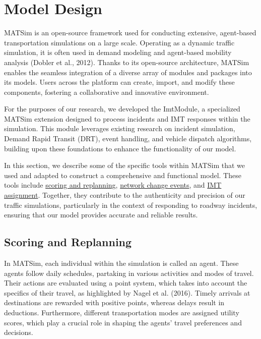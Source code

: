 \documentclass[fancy, oneside, mastersfancy, ms]{byuthesis}
\begin{document}
\hypertarget{sec-MATSim_mod}{%
\section{Model Design}\label{sec-MATSim_mod}}

MATSim is an open-source framework used for conducting extensive,
agent-based transportation simulations on a large scale. Operating as a
dynamic traffic simulation, it is often used in demand modeling and
agent-based mobility analysis (Dobler et al., 2012). Thanks to its
open-source architecture, MATSim enables the seamless integration of a
diverse array of modules and packages into its models. Users across the
platform can create, import, and modify these components, fostering a
collaborative and innovative environment.

For the purposes of our research, we developed the ImtModule, a
specialized MATSim extension designed to process incidents and IMT
responses within the simulation. This module leverages existing research
on incident simulation, Demand Rapid Transit (DRT), event handling, and
vehicle dispatch algorithms, building upon these foundations to enhance
the functionality of our model.

In this section, we describe some of the specific tools within MATSim
that we used and adapted to construct a comprehensive and functional
model. These tools include \protect\hyperlink{sec-MATSim_score}{scoring
and replanning}, \protect\hyperlink{sec-NCE}{network change events}, and
\protect\hyperlink{sec-imt_response}{IMT assignment}. Together, they
contribute to the authenticity and precision of our traffic simulations,
particularly in the context of responding to roadway incidents, ensuring
that our model provides accurate and reliable results.

\hypertarget{sec-MATSim_Score}{%
\subsection{Scoring and Replanning}\label{sec-MATSim_Score}}

In MATSim, each individual within the simulation is called an agent.
These agents follow daily schedules, partaking in various activities and
modes of travel. Their actions are evaluated using a point system, which
takes into account the specifics of their travel, as highlighted by
Nagel et al. (2016). Timely arrivals at destinations are rewarded with
positive points, whereas delays result in deductions. Furthermore,
different transportation modes are assigned utility scores, which play a
crucial role in shaping the agents' travel preferences and decisions.
\end{document}
